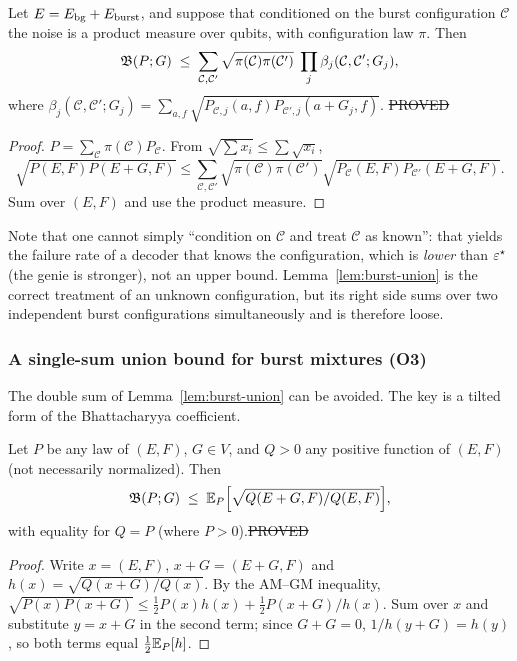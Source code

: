 \begin{lemma}\label{lem:burst-union}
Let $E=E_{\rm bg}+E_{\rm burst}$, and suppose that conditioned on the burst configuration $\mathcal C$ the noise is a product measure over qubits, with configuration law $\pi$. Then
\[
\mathfrak{B}(P;G)\;\le\;\sum_{\mathcal C,\mathcal C'}\sqrt{\pi(\mathcal C)\pi(\mathcal C')}\;\prod_{j}\beta_j(\mathcal C,\mathcal C';G_j),
\]
where $\beta_j(\mathcal C,\mathcal C';G_j)=\sum_{a,f}\sqrt{P_{\mathcal C,j}(a,f)P_{\mathcal C',j}(a+G_j,f)}$.
\hfill\st{PROVED}
\end{lemma}
\begin{proof}
$P=\sum_{\mathcal C}\pi(\mathcal C)P_{\mathcal C}$. From $\sqrt{\sum x_i}\le\sum\sqrt{x_i}$,
\[
\sqrt{P(E,F)P(E+G,F)}\le\sum_{\mathcal C,\mathcal C'}\sqrt{\pi(\mathcal C)\pi(\mathcal C')}\sqrt{P_{\mathcal C}(E,F)P_{\mathcal C'}(E+G,F)}.
\]
Sum over $(E,F)$ and use the product measure.
\end{proof}
\noindent Note that one cannot simply ``condition on $\mathcal C$ and treat $\mathcal C$ as known'': that yields the failure rate of a decoder that knows the configuration,
which is \emph{lower} than $\varepsilon^{\star}$ (the genie is stronger), not an upper bound. Lemma~\ref{lem:burst-union} is the correct treatment of an unknown configuration, but its right side sums over two independent burst configurations simultaneously
and is therefore loose.

\subsubsection*{A single-sum union bound for burst mixtures (O3)}

The double sum of Lemma~\ref{lem:burst-union} can be avoided. The key is a tilted form of the Bhattacharyya coefficient.

\begin{lemma}\label{lem:tilted}
Let $P$ be any law of $(E,F)$, $G\in V$, and $Q>0$ any positive function of $(E,F)$ (not necessarily normalized). Then
\[
\mathfrak{B}(P;G)\;\le\;\mathbb{E}_P\Big[\sqrt{Q(E+G,F)/Q(E,F)}\Big],
\]
with equality for $Q=P$ (where $P>0$).\hfill\st{PROVED}
\end{lemma}
\begin{proof}
Write $x=(E,F)$, $x+G=(E+G,F)$ and $h(x)=\sqrt{Q(x+G)/Q(x)}$. By the AM--GM inequality, $\sqrt{P(x)P(x+G)}\le\tfrac12P(x)h(x)+\tfrac12P(x+G)/h(x)$.
Sum over $x$ and substitute $y=x+G$ in the second term; since $G+G=0$, $1/h(y+G)=h(y)$, so both terms equal $\tfrac12\mathbb{E}_P[h]$.
\end{proof}


